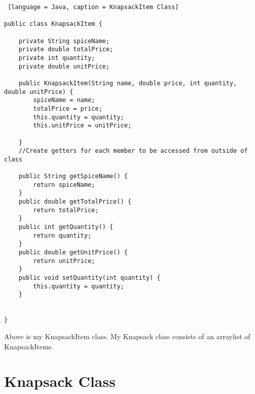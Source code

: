 \documentclass{article}
\begin{document}
\begin{lstlisting} [language = Java, caption = KnapsackItem Class]

public class KnapsackItem {
    
    private String spiceName;
    private double totalPrice;
    private int quantity;
    private double unitPrice;

    public KnapsackItem(String name, double price, int quantity, double unitPrice) {
        spiceName = name;
        totalPrice = price;
        this.quantity = quantity;
        this.unitPrice = unitPrice;

    }
    //Create getters for each member to be accessed from outside of class

    public String getSpiceName() {
        return spiceName;
    }
    public double getTotalPrice() {
        return totalPrice;
    }
    public int getQuantity() {
        return quantity;
    }
    public double getUnitPrice() {
        return unitPrice;
    }
    public void setQuantity(int quantity) {
        this.quantity = quantity;
    }


}

\end{lstlisting}

\noindent Above is my KnapsackItem class. My Knapsack class consists of an arraylist of KnapsackItems.

\section{Knapsack Class}
\end{document}
